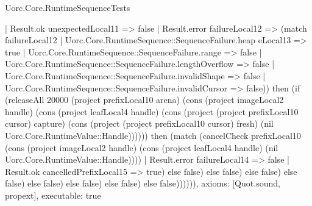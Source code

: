\begin{lexlean}{Uorc.Core.RuntimeSequenceTests}
\begin{semanticmodule}
{              | Result.ok unexpectedLocal11 => false
              | Result.error failureLocal12 => (match failureLocal12
                | Uorc.Core.RuntimeSequence::SequenceFailure.heap eLocal13 => true
                | Uorc.Core.RuntimeSequence::SequenceFailure.range => false
                | Uorc.Core.RuntimeSequence::SequenceFailure.lengthOverflow => false
                | Uorc.Core.RuntimeSequence::SequenceFailure.invalidShape => false
                | Uorc.Core.RuntimeSequence::SequenceFailure.invalidCursor => false)) then (if (releaseAll 20000 (project prefixLocal10 arena) (cons (project imageLocal2 handle) (cons (project leafLocal4 handle) (cons (project (project prefixLocal10 cursor) capture) (cons (project (project prefixLocal10 cursor) fresh) (nil Uorc.Core.RuntimeValue::Handle)))))) then (match (cancelCheck prefixLocal10 (cons (project imageLocal2 handle) (cons (project leafLocal4 handle) (nil Uorc.Core.RuntimeValue::Handle))))
              | Result.error failureLocal14 => false
              | Result.ok cancelledPrefixLocal15 => true) else false) else false) else false) else false) else false) else false) else false) else false)))))),
  axioms: [Quot.sound, propext],
  executable: true
}


\end{semanticmodule}
\end{lexlean}
